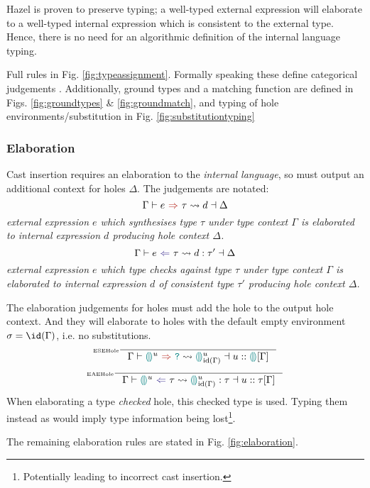 Hazel is proven to preserve typing; a well-typed external expression will elaborate to a well-typed internal expression which is consistent to the external type. Hence, there is no need for an algorithmic definition of the internal language typing.

Full rules in Fig. \ref{fig:typeassignment}. Formally speaking these define categorical judgements \cite{ModalJudgements}. Additionally, ground types and a matching function are defined in Figs. \ref{fig:groundtypes} \& \ref{fig:groundmatch}, and typing of hole environments/substitution in Fig. \ref{fig:substitutiontyping}
\subsubsection{Elaboration}
Cast insertion requires an elaboration to the \textit{internal language}, so must output an additional context for holes $\Delta$. The judgements are notated: \[\elaborationSynthesis{e}{\tau}{d}{\Delta}\]\textit{
external expression $e$ which synthesises type $\tau$ under type context $\Gamma$ is elaborated to internal expression $d$ producing hole context $\Delta$. }
\[\elaborationAnalysis{e}{\tau}{d}{\tau'}{\Delta}\]\textit{
external expression $e$ which type checks against type $\tau$ under type context $\Gamma$ is elaborated to internal expression $d$ of consistent type $\tau'$ producing hole context $\Delta$.}

The elaboration judgements for holes must add the hole to the output hole context. And they will elaborate to holes with the default empty environment $\sigma = \id(\Gamma)$, i.e. no substitutions.
\[\inference[\tiny ESEHole]{}{\elaborationSynthesis{\hole^u}{\dyn}{\hole^u_{\mathrm{id}(\Gamma)}}{u :: \hole[] [\Gamma]}}\]
\[\inference[\tiny EAEHole]{}{\elaborationAnalysis{\hole^u}{\tau}{\hole^u_{\mathrm{id}(\Gamma)}}{\tau}{u::\tau[\Gamma]}}\]
When elaborating a type \textit{checked} hole, this checked type is used. Typing them instead as {\dyn} would imply type information being lost\footnote{Potentially leading to incorrect cast insertion.}.

The remaining elaboration rules are stated in Fig. \ref{fig:elaboration}.

